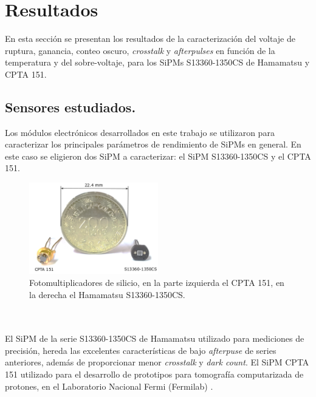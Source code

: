 \chapter{Resultados}
En esta sección se presentan los resultados de la caracterización del voltaje de ruptura, ganancia, conteo oscuro, \textit{crosstalk} y \textit{afterpulses} en función de la temperatura y del sobre-voltaje, para los SiPMs S13360-1350CS de Hamamatsu y CPTA 151.   
\label{Cap:Caracterizacion}
\section{Sensores estudiados.}
Los módulos electrónicos desarrollados en este trabajo se utilizaron para caracterizar los principales parámetros de rendimiento de SiPMs en general. En este caso se eligieron dos SiPM a caracterizar: el SiPM S13360-1350CS y el CPTA 151.
\begin{figure}[h!]
\begin{centering}
  \includegraphics[width=0.5\textwidth]{Images/SiPMs.PNG}
    \caption{Fotomultiplicadores de silicio, en la parte izquierda el CPTA 151, en la derecha el Hamamatsu S13360-1350CS.}%
    \label{fig:SiPMs}  
  \par\end{centering}
\end{figure}
\\ \\
El SiPM de la serie S13360-1350CS de Hamamatsu %
utilizado para mediciones de precisión, hereda las excelentes características de bajo \textit{afterpuse} de series anteriores, además de proporcionar menor \textit{crosstalk} y \textit{dark count}.
El SiPM CPTA 151 utilizado para el desarrollo de prototipos para tomografía computarizada de protones, en el Laboratorio Nacional Fermi (Fermilab) \citep{pCT_fermilab}.\\ \\%
